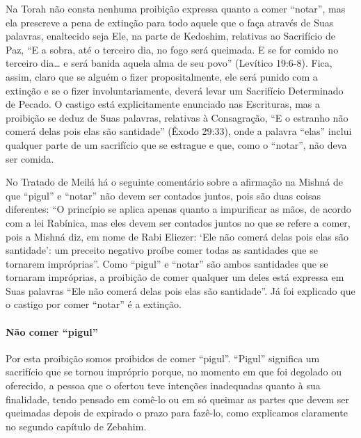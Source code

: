 Na Torah não consta nenhuma proibição expressa quanto a comer ``notar'',
mas ela prescreve a pena de extinção para todo aquele que o faça
através de Suas palavras, enaltecido seja Ele, na parte de Kedoshim,
relativas ao Sacrifício de Paz, ``E a sobra, até o terceiro dia, no fogo
será queimada. E se for comido no terceiro dia\ldots{} e será banida aquela
alma de seu povo'' (Levítico 19:6-8). Fica, assim, claro que se alguém o
fizer propositalmente, ele será punido com a extinção e se o fizer
involuntariamente, deverá levar um Sacrifício Determinado de Pecado. O
castigo está explicitamente enunciado nas Escrituras, mas a proibição
se deduz de Suas palavras, relativas à Consagração, ``E o estranho não
comerá delas pois elas são santidade'' (Êxodo 29:33), onde a palavra
``elas'' inclui qualquer parte de um sacrifício que se estrague e que,
como o ``notar'', não deva ser comida.

No Tratado de Meilá há o seguinte comentário sobre a afirmação na Mishná
de que ``pigul'' e ``notar'' não devem ser contados juntos, pois são
duas coisas diferentes: ``O princípio se aplica apenas quanto a
impurificar as mãos, de acordo com a lei Rabínica, mas eles devem ser
contados juntos no que se refere a comer, pois a Mishná diz, em nome de
Rabi Eliezer: `Ele não comerá delas pois elas são santidade': um
preceito negativo proíbe comer todas as santidades que se tornarem
impróprias''. Como ``pigul'' e ``notar'' são ambos santidades que se
tornaram impróprias, a proibição de comer qualquer um deles está
expressa em Suas palavras ``Ele não comerá delas pois elas são
santidade''. Já foi explicado que o castigo por comer ``notar'' é a
extinção.

\paragraph{Não comer ``pigul''}

Por esta proibição somos proibidos de comer ``pigul''. ``Pigul''
significa um sacrifício que se tornou impróprio porque, no momento em
que foi degolado ou oferecido, a pessoa que o ofertou teve intenções
inadequadas quanto à sua finalidade, tendo pensado em comê-lo ou em só
queimar as partes que devem ser queimadas depois de expirado o prazo
para fazê-lo, como explicamos claramente no segundo capítulo de
Zebahim.

